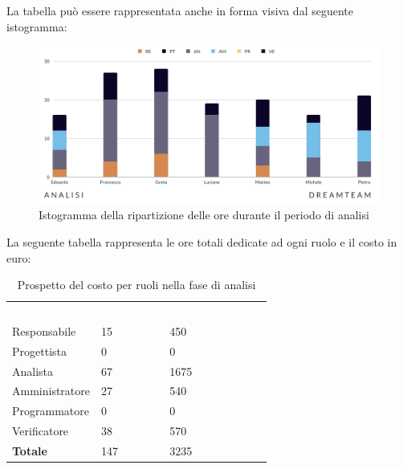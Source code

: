 La tabella può essere rappresentata anche in forma visiva dal seguente istogramma: 
\begin{figure}[H]
\centering
\includegraphics[scale=0.65]{Sezioni/SezioniPreventivo/grafici/Analisi.png}
\caption{Istogramma della ripartizione delle ore durante il periodo di analisi}
\end{figure}

La seguente tabella rappresenta le ore totali dedicate ad ogni ruolo e il costo in euro:

\begin{table}[H]
\begin{center}
\renewcommand{\arraystretch}{1.5}
\begin{tabular}{ m{}<{\centering}  m{}<{\centering} m{}<{\centering}}
	\rowcolor{darkblue}
	\textcolor{white}{\textbf{Ruolo}}&\textcolor{white}{\textbf{Totale ore}}&\textcolor{white}{\textbf{Costo totale (\euro)}}\\ 

	Responsabile  & 15 &  450\\	
	
	Progettista & 0 &  0 \\
	
	Analista & 67 &  1675\\

	Amministratore & 27 &  540\\
	
	Programmatore & 0 &  0\\
	
	Verificatore & 38 &  570\\
	
	\textbf{Totale} & 147 &  3235 \\
	
\end{tabular}
\caption{Prospetto del costo per ruoli nella fase di analisi}
\end{center}
\end{table}


